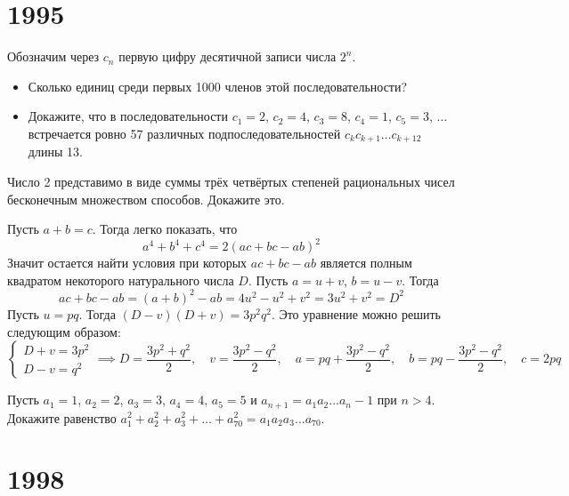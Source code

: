 \documentclass[11pt, a4paper]{common/document_template}
\begin{document}
\chapter{1995}

\begin{exercise}[1473]
Обозначим через $c_{n}$ первую цифру десятичной записи числа $2^{n}$. 
\begin{itemize}
\item Сколько единиц среди первых 1000 членов этой последовательности?
\item Докажите, что в последовательности $c_{1} = 2$, $c_{2} = 4$, $c_{3} = 8$, $c_{4} = 1$, $c_{5} = 3$, $\dots$ встречается ровно 57 различных подпоследовательностей $c_{k}c_{k+1}\dots c_{k+12}$ длины 13.
\end{itemize} 
\end{exercise}

\begin{exercise}[1499]
Число 2 представимо в виде суммы трёх четвёртых степеней рациональных чисел бесконечным множеством способов. Докажите это.
\end{exercise}

\begin{Solution}
Пусть $a + b = c$. Тогда легко показать, что
$$
a^{4} + b^{4} + c^{4} = 2(ac + bc - ab)^{2}
$$
Значит остается найти условия при которых $ac + bc - ab$ является полным квадратом некоторого натурального числа $D$. Пусть $a = u + v$, $b = u - v$. Тогда
$$
ac + bc - ab = (a + b)^{2} - ab = 4u^{2} - u^{2} + v^{2} = 3u^{2} + v^{2} = D^{2}
$$
Пусть $u = pq$. Тогда $(D - v)(D + v) = 3p^{2}q^{2}$. Это уравнение можно решить следующим образом:
$$
\begin{cases}
D + v = 3p^{2}\\
D - v = q^{2}
\end{cases} \implies D = \frac{3p^{2} + q^{2}}{2}, \quad v = \frac{3p^{2} - q^{2}}{2}, \quad a = pq + \frac{3p^{2} - q^{2}}{2}, \quad b = pq - \frac{3p^{2} - q^{2}}{2},\quad c = 2pq
$$
\end{Solution}

\begin{exercise}[1523]
Пусть $a_{1} = 1$, $a_{2} = 2$, $a_{3} = 3$, $a_{4} = 4$, $a_{5} = 5$ и $a_{n+1} = a_{1}a_{2} \dots a_{n} - 1$ при $n > 4$. Докажите равенство $a_{1}^{2} + a_{2}^{2} + a_{3}^{2} + \dots + a_{70}^{2} = a_{1} a_{2} a_{3} \dots a_{70}$.
\end{exercise}


\chapter{1998}
\end{document}
